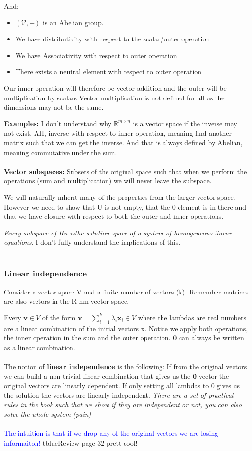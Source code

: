 \documentclass{article}
\newcommand{\tblue}[1]{\textcolor{blue}{#1}}
\begin{document}
And:
\begin{itemize}
    \item $(\mathcal{V}, + )$ is an Abelian group.
    \item We have distributivity with respect to the scalar/outer operation 
    \item We have Associativity with respect to outer operation
    \item There exists a neutral element with respect to outer operation
\end{itemize}
Our inner operation will therefore be vector addition and the outer will be multiplication by scalars
Vector multiplication is not defined for all as the dimensions may not be the same.

\textbf{Examples:} I don't understand why $\mathbb{R}^{m \times n} $ is a vector space if the inverse may not exist. AH, inverse with respect to inner operation,
meaning find another matrix such that we can get the inverse. And that is always defined by Abelian, meaning commutative under the sum.
\\
\\
\textbf{Vector subspaces:} 
Subsets of the original space such that when we perform the operations (sum and multiplication) we will never
leave the subspace. 

We will naturally inherit many of the properties from the larger vector space.
However we need to show that U is not empty, that the 0 element is in there and that we
have closure with respect to both the outer and inner operations.

\textit{Every subspace of Rn isthe solution space of a system of homogeneous linear equations.}
I don't fully understand the implications of this.
\\
\\
\subsubsection{Linear independence}
Consider a vector space V and a finite number of vectors (k). Remember matrices are also vectors in the R nm vector space.

Every $\textbf{v} \in V $ of the form $\textbf{v} = \sum_{i=1}^{k}\lambda_i \textbf{x}_i \in V$
where the lambdas are real numbers are a linear combination of the initial vectors x.
Notice we apply both operations, the inner operation in the sum and the outer operation.
$\textbf{0}$ can always be written as a linear combination.
\\
\\
The notion of \textbf{linear independence} is the following: If from the original vectors we
can build a non trivial linear combination that gives us the $\textbf{0}$ vector the original vectors are linearly dependent.
If only setting all lambdas to 0 gives us the solution the vectors are linearly independent.
\textit{There are a set of practical rules in the book such that we show if they are independent or not, you can also solve the whole system (pain)}
\\
\\
\tblue{The intuition is that if we drop any of the original vectors we are losing informaiton!}
tblue{Review page 32 prett cool!}
\end{document}
